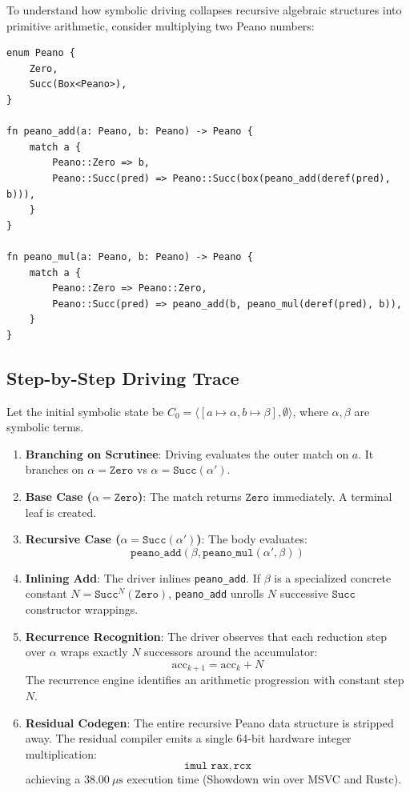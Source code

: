 To understand how symbolic driving collapses recursive algebraic structures into primitive arithmetic, consider multiplying two Peano numbers:
\begin{lstlisting}[language=NumLang]
enum Peano {
    Zero,
    Succ(Box<Peano>),
}

fn peano_add(a: Peano, b: Peano) -> Peano {
    match a {
        Peano::Zero => b,
        Peano::Succ(pred) => Peano::Succ(box(peano_add(deref(pred), b))),
    }
}

fn peano_mul(a: Peano, b: Peano) -> Peano {
    match a {
        Peano::Zero => Peano::Zero,
        Peano::Succ(pred) => peano_add(b, peano_mul(deref(pred), b)),
    }
}
\end{lstlisting}

\subsection{Step-by-Step Driving Trace}
Let the initial symbolic state be $C_0 = \langle [a \mapsto \alpha, b \mapsto \beta], \emptyset \rangle$, where $\alpha, \beta$ are symbolic terms.
\begin{enumerate}
    \item \textbf{Branching on Scrutinee}: Driving evaluates the outer match on $a$. It branches on $\alpha = \mathtt{Zero}$ vs $\alpha = \mathtt{Succ}(\alpha')$.
    \item \textbf{Base Case ($\alpha = \mathtt{Zero}$)}: The match returns $\mathtt{Zero}$ immediately. A terminal leaf is created.
    \item \textbf{Recursive Case ($\alpha = \mathtt{Succ}(\alpha')$)}: The body evaluates:
    \begin{equation}
    \mathtt{peano\_add}(\beta, \mathtt{peano\_mul}(\alpha', \beta))
    \end{equation}
    \item \textbf{Inlining Add}: The driver inlines \texttt{peano\_add}. If $\beta$ is a specialized concrete constant $N = \mathtt{Succ}^N(\mathtt{Zero})$, \texttt{peano\_add} unrolls $N$ successive $\mathtt{Succ}$ constructor wrappings.
    \item \textbf{Recurrence Recognition}: The driver observes that each reduction step over $\alpha$ wraps exactly $N$ successors around the accumulator:
    \begin{equation}
    \text{acc}_{k+1} = \text{acc}_k + N
    \end{equation}
    The recurrence engine identifies an arithmetic progression with constant step $N$.
    \item \textbf{Residual Codegen}: The entire recursive Peano data structure is stripped away. The residual compiler emits a single 64-bit hardware integer multiplication:
    \begin{equation}
    \mathtt{imul}\; \mathtt{rax}, \mathtt{rcx}
    \end{equation}
    achieving a $38.00\ \mu\text{s}$ execution time (Showdown win over MSVC and Rustc).
\end{enumerate}

